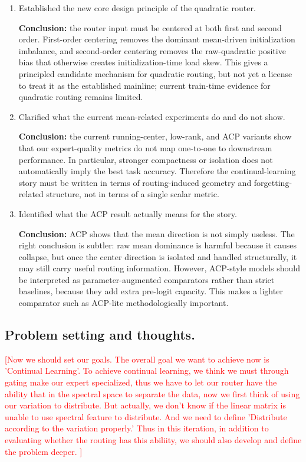 \documentclass[11pt]{article}
\newcommand{\idea}[1]{\textcolor{red}{[#1]}}
\begin{document}
\begin{enumerate}
    \item Established the new core design principle of the quadratic router.

    \textbf{Conclusion:} the router input must be centered at both first and second order. First-order centering removes the dominant mean-driven initialization imbalance, and second-order centering removes the raw-quadratic positive bias that otherwise creates initialization-time load skew. This gives a principled candidate mechanism for quadratic routing, but not yet a license to treat it as the established mainline; current train-time evidence for quadratic routing remains limited.

    \item Clarified what the current mean-related experiments do and do not show.

    \textbf{Conclusion:} the current running-center, low-rank, and ACP variants show that our expert-quality metrics do not map one-to-one to downstream performance. In particular, stronger compactness or isolation does not automatically imply the best task accuracy. Therefore the continual-learning story must be written in terms of routing-induced geometry and forgetting-related structure, not in terms of a single scalar metric.

    \item Identified what the ACP result actually means for the story.

    \textbf{Conclusion:} ACP shows that the mean direction is not simply useless. The right conclusion is subtler: raw mean dominance is harmful because it causes collapse, but once the center direction is isolated and handled structurally, it may still carry useful routing information. However, ACP-style models should be interpreted as parameter-augmented comparators rather than strict baselines, because they add extra pre-logit capacity. This makes a lighter comparator such as ACP-lite methodologically important.

\end{enumerate}

\subsection{Problem setting and thoughts.}

\idea{Now we should set our goals. The overall goal we want to achieve now is 'Continual Learning'. To achieve continual learning, we think we must through gating make our expert specialized, thus we have to let our router have the ability that in the spectral space to separate the data, now we first think of using our variation to distribute. 
But actually, we don't know if the linear matrix is unable to use spectral feature to distribute. And we need to define 'Distribute according to the variation properly.'
Thus in this iteration, in addition to evaluating whether the routing has this abiliity, we should also develop and define the problem deeper.
}
\end{document}
